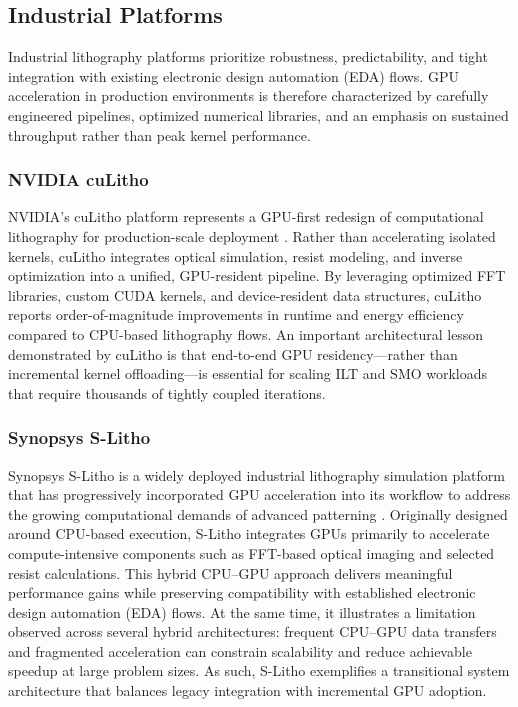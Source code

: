 \documentclass[pdflatex,sn-mathphys-num]{sn-jnl}%
\theoremstyle{thmstyleone}%
\theoremstyle{thmstyletwo}%
\theoremstyle{thmstylethree}%
\begin{document}
\subsection{Industrial Platforms}
Industrial lithography platforms prioritize robustness, predictability, and tight integration with existing electronic design automation (EDA) flows. GPU acceleration in production environments is therefore characterized by carefully engineered pipelines, optimized numerical libraries, and an emphasis on sustained throughput rather than peak kernel performance.

\subsubsection{NVIDIA cuLitho}
NVIDIA’s cuLitho platform represents a GPU-first redesign of computational lithography for production-scale deployment \cite{Singh}. Rather than accelerating isolated kernels, cuLitho integrates optical simulation, resist modeling, and inverse optimization into a unified, GPU-resident pipeline. By leveraging optimized FFT libraries, custom CUDA kernels, and device-resident data structures, cuLitho reports order-of-magnitude improvements in runtime and energy efficiency compared to CPU-based lithography flows. An important architectural lesson demonstrated by cuLitho is that end-to-end GPU residency—rather than incremental kernel offloading—is essential for scaling ILT and SMO workloads that require thousands of tightly coupled iterations.

\subsubsection{Synopsys S-Litho}
Synopsys S-Litho is a widely deployed industrial lithography simulation platform that has progressively incorporated GPU acceleration into its workflow to address the growing computational demands of advanced patterning \cite{SynopsysSLitho}. Originally designed around CPU-based execution, S-Litho integrates GPUs primarily to accelerate compute-intensive components such as FFT-based optical imaging and selected resist calculations. This hybrid CPU–GPU approach delivers meaningful performance gains while preserving compatibility with established electronic design automation (EDA) flows. At the same time, it illustrates a limitation observed across several hybrid architectures: frequent CPU–GPU data transfers and fragmented acceleration can constrain scalability and reduce achievable speedup at large problem sizes. As such, S-Litho exemplifies a transitional system architecture that balances legacy integration with incremental GPU adoption.
\end{document}
